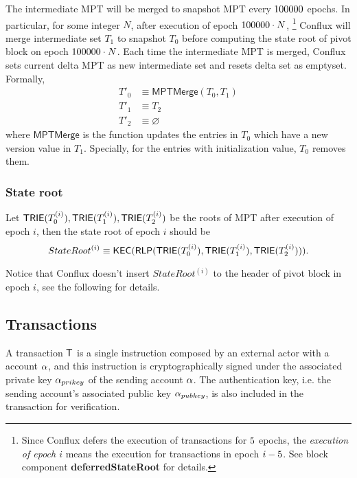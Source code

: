 The intermediate MPT will be merged to snapshot MPT every $100000$ epochs. In particular, for some integer $N$, after execution of epoch $100000\cdot N$, \footnote{Since Conflux defers the execution of transactions for ${5}$ epochs, the \emph{execution of epoch $i$} means the execution for transactions in epoch $i-{5}$. See block component {\bf deferredStateRoot} for details.} Conflux will merge intermediate set $T_1$ to snapshot $T_0$ before computing the state root of pivot block on epoch $100000\cdot N$. Each time the intermediate MPT is merged, Conflux sets current delta MPT as new intermediate set and resets delta set as emptyset. Formally,  
\begin{align}
	T'_0 &\equiv \mathsf{MPTMerge}(T_0,T_1) \\
	T'_1 &\equiv T_2 \\
	T'_2 &\equiv \varnothing
\end{align}
%
where $\mathsf{MPTMerge}$ is the function updates the entries in $T_0$ which have a new version value in $T_1$. Specially, for the entries with initialization value, $T_0$ removes them.  


\subsubsection{State root}

Let $\mathsf{TRIE}(T^{(i)}_0),\mathsf{TRIE}(T^{(i)}_1),\mathsf{TRIE}(T^{(i)}_2)$ be the roots of MPT after execution of epoch $i$, then the state root of epoch $i$ should be 
%
$$ StateRoot^{(i)}\equiv\mathsf{KEC}(\mathsf{RLP}(\mathsf{TRIE}(T^{(i)}_0),\mathsf{TRIE}(T^{(i)}_1),\mathsf{TRIE}(T^{(i)}_2))).$$

Notice that Conflux doesn't insert $StateRoot^{(i)}$ to the header of pivot block in epoch $i$, see the following for details. 


\subsection{Transactions}
\label{sec:tx}

A {\name} transaction $\textsf{T}$ is a single instruction composed by an external actor with a {\name} account $\mathbf{\alpha}$, and this instruction is cryptographically signed under the associated private key $\mathbf{\alpha}_{prikey}$ of the sending account $\mathbf{\alpha}$.
The authentication key, i.e. the sending account's associated public key $\mathbf{\alpha}_{pubkey}$, is also included in the transaction for verification.

